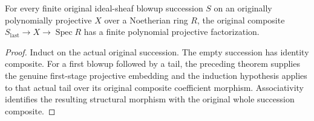 \begin{theorem}
\label{thm:fc-original-blowup-sequence-polynomial-projectivity}
\leanok
{}
For every finite original ideal-sheaf blowup succession $S$ on an originally
polynomially projective $X$ over a Noetherian ring $R$, the original composite
$S_{\mathrm{last}}\to X\to\operatorname{Spec}R$ has a finite polynomial projective factorization.
\end{theorem}
\begin{proof}
Induct on the actual original succession.  The empty succession has identity
composite.  For a first blowup followed by a tail, the preceding theorem supplies
the genuine first-stage projective embedding and the induction hypothesis applies
to that actual tail over its original composite coefficient morphism.
Associativity identifies the resulting structural morphism with the original
whole succession composite.
\end{proof}
